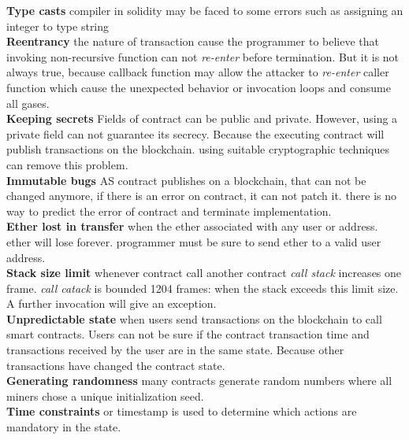 \textbf{Type casts} compiler in solidity may be faced to some errors such as assigning an integer to type string\\
\textbf{Reentrancy} the nature of transaction cause the programmer to believe that invoking non-recursive function can not \textit{re-enter} before termination. But it is not always true, because callback function may allow the attacker to \textit{re-enter} caller function which cause the unexpected behavior or invocation loops and consume all gases.\\
\textbf{Keeping secrets} Fields of contract can be public and private. However, using a private field can not guarantee its secrecy. Because the executing contract will publish transactions on the blockchain. using suitable cryptographic techniques can remove this problem.  \\
\textbf{Immutable bugs} AS contract publishes on a blockchain, that can not be changed anymore, if there is an error on contract, it can not patch it. there is no way to predict the error of contract and terminate implementation. \\
\textbf{Ether lost in transfer} when the ether associated with any user or address.  ether will lose forever. programmer must be sure to send ether to a valid user address. \\
\textbf{Stack size limit} whenever contract call another contract \textit{call stack} increases one frame. \textit{call catack} is bounded 1204 frames: when the stack exceeds this limit size.  A further invocation will give an exception.\\
\textbf{Unpredictable state} when users send transactions on the blockchain to call smart contracts. Users can not be sure if the contract transaction time and transactions received by the user are in the same state. Because other transactions have changed the contract state. \\ 
\textbf{Generating randomness} many contracts generate random numbers where all miners chose a unique initialization seed.  \\
\textbf{Time constraints} or timestamp is used to determine which actions are mandatory in the state. \\
